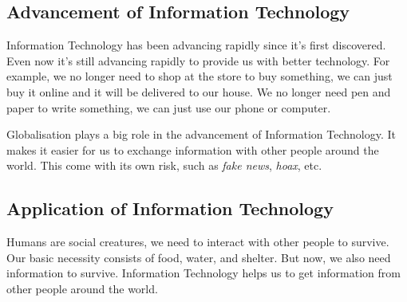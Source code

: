 \documentclass[12pt,titlepage]{article}
\begin{document}
\subsection{Advancement of Information Technology}
Information Technology has been advancing rapidly since it's first discovered. Even now it's still advancing
rapidly to provide us with better technology. For example, we no longer need to shop at the store to buy something,
we can just buy it online and it will be delivered to our house. We no longer need pen and paper to write something,
we can just use our phone or computer.

Globalisation plays a big role in the advancement of Information Technology.
It makes it easier for us to exchange information with other people around the world.
This come with its own risk, such as \textit{fake news}, \textit{hoax}, etc.

\subsection{Application of Information Technology}
Humans are social creatures, we need to interact with other people to survive.
Our basic necessity consists of food, water, and shelter. But now, we also need
information to survive. Information Technology helps us to get information from 
other people around the world.
\end{document}
